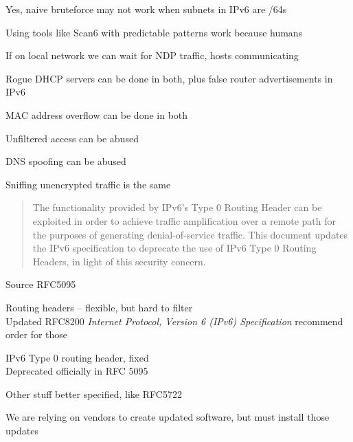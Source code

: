 \documentclass[Screen16to9,17pt]{foils}
\begin{document}
\begin{list2}
\item Yes, naive bruteforce may not work when subnets in IPv6 are /64s
\item Using tools like Scan6 with predictable patterns work because humans
\item If on local network we can wait for NDP traffic, hosts communicating
\end{list2}




\begin{list2}
\item Rogue DHCP servers can be done in both, plus false router advertisements in IPv6
\item MAC address overflow can be done in both
\item Unfiltered access can be abused
\item DNS spoofing can be abused
\item Sniffing unencrypted traffic is the same
\end{list2}



\begin{quote}
The functionality provided by IPv6's Type 0 Routing Header can be exploited in order to achieve traffic amplification over a remote path for the purposes of generating denial-of-service traffic.  This document updates the IPv6 specification to deprecate the use of IPv6 Type 0 Routing Headers, in light of this security concern.
\end{quote}
Source RFC5095


\begin{list2}
\item Routing headers -- flexible, but hard to filter\\
Updated RFC8200 \emph{Internet Protocol, Version 6 (IPv6) Specification} recommend order for those
\item IPv6 Type 0 routing header, fixed\\
Deprecated officially in RFC 5095 
\item Other stuff better specified, like RFC5722
\end{list2}

We are relying on vendors to create updated software, but must install those updates
\end{document}
